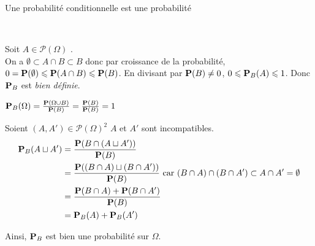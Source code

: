\documentclass{article}
\begin{document}
	{Une probabilité conditionnelle est une probabilité}
	
	~\\
	\begin{liste}
		\item Soit $A \in \mathcal{P}(\Omega)$ \fq. \\
		On a $\emptyset \subset A \cap B  \subset B$ donc par croissance de la probabilité, $0 = \mathbf P(\emptyset) \leqslant \mathbf P(A \cap B) \leqslant \mathbf P(B)$.
		En divisant par $\mathbf P(B) \neq 0$, $0 \leqslant \mathbf P_B(A) \leqslant 1$. Donc $\mathbf P_B$ est \textit{bien définie}.
		\item $\mathbf P_B(\Omega)
		= \frac{\mathbf P(\Omega \cup B)}{\mathbf P(B)}
		= \frac{\mathbf P(B)}{\mathbf P(B)}
		= 1$
		\item Soient $(A, A') \in \mathcal{P}(\Omega)^2$ \fq* \tq* $A$ et $A'$ sont incompatibles.
		\begin{equation}
			\begin{aligned}
				\mathbf P_B(A \sqcup A')
				&= \frac{ \mathbf P(B \cap (A \sqcup A') ) }{ \mathbf P(B) } \\
				&= \frac{ \mathbf P( (B \cap A) \sqcup (B \cap A') ) }{ \mathbf P(B) } \text{ car } (B \cap A) \cap (B \cap A') \subset A \cap A' = \emptyset \\
				&= \frac{ \mathbf P(B \cap A) + \mathbf P(B \cap A') }{ \mathbf P(B) } \\
				&= \mathbf P_B(A) + \mathbf P_B(A')
			\end{aligned}
		\end{equation}
	\end{liste}
	Ainsi, $\mathbf P_B$ est bien une probabilité sur $\Omega$.
\end{question_kholle}
\end{document}
